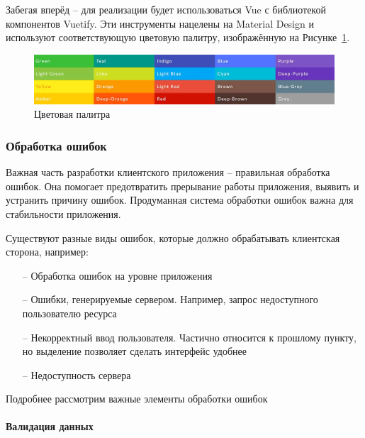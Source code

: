 \documentclass[a4paper,article]{article}
\begin{document}
\begin{sloppypar}
    Забегая вперёд -- для реализации будет использоваться Vue с библиотекой компонентов Vuetify. Эти инструменты нацелены на Material Design и используют соответствующую цветовую палитру, изображённую на Рисунке~\ref{fig:colorscheme}.
    
    \begin{figure}[h]
        
        \centering
        
        \includegraphics[width=0.8\linewidth]{Цветовая палитра.png}
        
        \caption{\centering Цветовая палитра}
        
        \label{fig:colorscheme}
        
    \end{figure}

    \subsubsection{Обработка ошибок}\label{Проектирование клиента. Обработка ошибок}

    Важная часть разработки клиентского приложения -- правильная обработка ошибок. Она помогает предотвратить прерывание работы приложения, выявить и устранить причину ошибок. Продуманная система обработки ошибок важна для стабильности приложения.

    Существуют разные виды ошибок, которые должно обрабатывать клиентская сторона, например:

    \begin{itemize}[nolistsep]
        \item[--] Обработка ошибок на уровне приложения
        \item[--] Ошибки, генерируемые сервером. Например, запрос недоступного пользователю ресурса
        \item[--] Некорректный ввод пользователя. Частично относится к прошлому пункту, но выделение позволяет сделать интерфейс удобнее
        \item[--] Недоступность сервера
    \end{itemize}

    Подробнее рассмотрим важные элементы обработки ошибок

    \paragraph{Валидация данных}\label{Проектирование клиента. Валидация данных}


\end{sloppypar}
\end{document}
